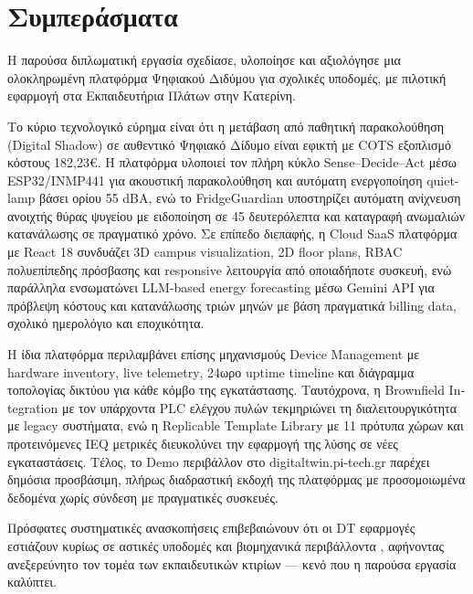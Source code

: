 \chapter{Συμπεράσματα}

Η παρούσα διπλωματική εργασία σχεδίασε, υλοποίησε και αξιολόγησε μια ολοκληρωμένη πλατφόρμα Ψηφιακού Διδύμου για σχολικές υποδομές, με πιλοτική εφαρμογή στα Εκπαιδευτήρια Πλάτων στην Κατερίνη.

Το κύριο τεχνολογικό εύρημα είναι ότι η μετάβαση από παθητική παρακολούθηση (\textlatin{Digital Shadow}) σε αυθεντικό Ψηφιακό Δίδυμο είναι εφικτή με \textlatin{COTS} εξοπλισμό κόστους 182,23\euro. Η πλατφόρμα υλοποιεί τον πλήρη κύκλο \textlatin{Sense--Decide--Act} μέσω \textlatin{ESP32/INMP441} για ακουστική παρακολούθηση και αυτόματη ενεργοποίηση \textlatin{quiet-lamp} βάσει ορίου 55 \textlatin{dBA}, ενώ το \textlatin{FridgeGuardian} υποστηρίζει αυτόματη ανίχνευση ανοιχτής θύρας ψυγείου με ειδοποίηση σε 45 δευτερόλεπτα και καταγραφή ανωμαλιών κατανάλωσης σε πραγματικό χρόνο. Σε επίπεδο διεπαφής, η \textlatin{Cloud SaaS} πλατφόρμα με \textlatin{React 18} συνδυάζει \textlatin{3D campus visualization}, \textlatin{2D floor plans}, \textlatin{RBAC} πολυεπίπεδης πρόσβασης και \textlatin{responsive} λειτουργία από οποιαδήποτε συσκευή, ενώ παράλληλα ενσωματώνει \textlatin{LLM-based energy forecasting} μέσω \textlatin{Gemini API} για πρόβλεψη κόστους και κατανάλωσης τριών μηνών με βάση πραγματικά \textlatin{billing data}, σχολικό ημερολόγιο και εποχικότητα.

Η ίδια πλατφόρμα περιλαμβάνει επίσης μηχανισμούς \textlatin{Device Management} με \textlatin{hardware inventory}, \textlatin{live telemetry}, 24ωρο \textlatin{uptime timeline} και διάγραμμα τοπολογίας δικτύου για κάθε κόμβο της εγκατάστασης. Ταυτόχρονα, η \textlatin{Brownfield Integration} με τον υπάρχοντα \textlatin{PLC} ελέγχου πυλών τεκμηριώνει τη διαλειτουργικότητα με \textlatin{legacy} συστήματα, ενώ η \textlatin{Replicable Template Library} με 11 πρότυπα χώρων και προτεινόμενες \textlatin{IEQ} μετρικές διευκολύνει την εφαρμογή της λύσης σε νέες εγκαταστάσεις. Τέλος, το \textlatin{Demo} περιβάλλον στο \textlatin{digitaltwin.pi-tech.gr} παρέχει δημόσια προσβάσιμη, πλήρως διαδραστική εκδοχή της πλατφόρμας με προσομοιωμένα δεδομένα χωρίς σύνδεση με πραγματικές συσκευές.

Πρόσφατες συστηματικές ανασκοπήσεις επιβεβαιώνουν ότι οι \textlatin{DT} εφαρμογές εστιάζουν κυρίως σε αστικές υποδομές και βιομηχανικά περιβάλλοντα \cite{Doulka2024}, αφήνοντας ανεξερεύνητο τον τομέα των εκπαιδευτικών κτιρίων --- κενό που η παρούσα εργασία καλύπτει.


